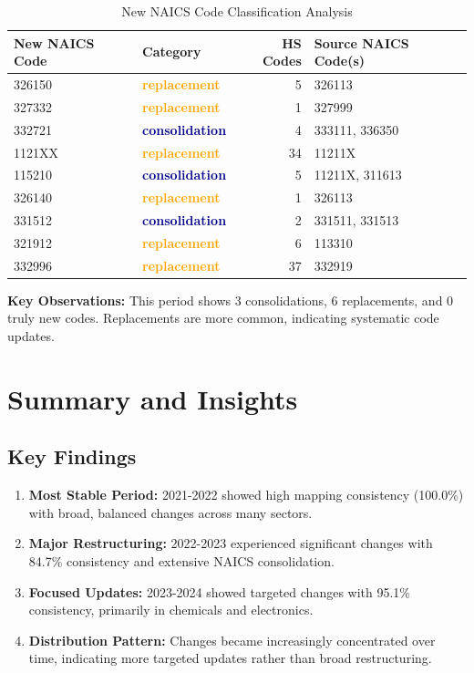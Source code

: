 \documentclass[11pt]{article}
\begin{document}
\begin{table}[H]
\centering
{}
\begin{tabular}{llrl}
\toprule
\textbf{New NAICS Code} & \textbf{Category} & \textbf{HS Codes} & \textbf{Source NAICS Code(s)} \\
\midrule
326150 & \textcolor{orange}{\textbf{replacement}} & 5 & 326113 \\
327332 & \textcolor{orange}{\textbf{replacement}} & 1 & 327999 \\
332721 & \textcolor{darkblue}{\textbf{consolidation}} & 4 & 333111, 336350 \\
1121XX & \textcolor{orange}{\textbf{replacement}} & 34 & 11211X \\
115210 & \textcolor{darkblue}{\textbf{consolidation}} & 5 & 11211X, 311613 \\
326140 & \textcolor{orange}{\textbf{replacement}} & 1 & 326113 \\
331512 & \textcolor{darkblue}{\textbf{consolidation}} & 2 & 331511, 331513 \\
321912 & \textcolor{orange}{\textbf{replacement}} & 6 & 113310 \\
332996 & \textcolor{orange}{\textbf{replacement}} & 37 & 332919 \\
\bottomrule
\end{tabular}
\caption{New NAICS Code Classification Analysis}
\end{table}

\textbf{Key Observations:} This period shows 3 consolidations, 6 replacements, and 0 truly new codes. Replacements are more common, indicating systematic code updates.

\newpage


\section{Summary and Insights}

\subsection{Key Findings}

\begin{enumerate}
    \item \textbf{Most Stable Period:} 2021-2022 showed high mapping consistency (100.0\%) with broad, balanced changes across many sectors.
    
    \item \textbf{Major Restructuring:} 2022-2023 experienced significant changes with 84.7\% consistency and extensive NAICS consolidation.
    
    \item \textbf{Focused Updates:} 2023-2024 showed targeted changes with 95.1\% consistency, primarily in chemicals and electronics.
    
    \item \textbf{Distribution Pattern:} Changes became increasingly concentrated over time, indicating more targeted updates rather than broad restructuring.
\end{enumerate}
\end{document}
